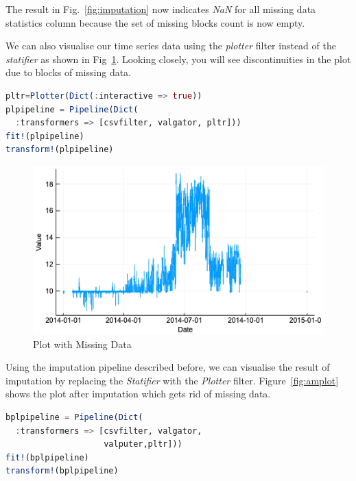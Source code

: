 \documentclass{juliacon}
\begin{document}
The result in Fig.~\ref{fig:imputation} now indicates \emph{NaN} for all missing data statistics column because the set 
of missing blocks count is now empty.

\vskip 3pt

We can also visualise our time series data using the \emph{plotter} filter instead of the \emph{statifier} as shown in Fig~\ref{fig:mplot}. Looking closely, you will see discontinuities in the plot due to blocks of missing data.

\begin{lstlisting}[language = Julia]
pltr=Plotter(Dict(:interactive => true))
plpipeline = Pipeline(Dict(
  :transformers => [csvfilter, valgator, pltr]))
fit!(plpipeline)
transform!(plpipeline)
\end{lstlisting}

\begin{figure}[htbp]
   \centering
   \includegraphics[width=\columnwidth]{mplot.png} %
   \caption{Plot with Missing Data}
   \label{fig:mplot}
\end{figure}

Using the imputation pipeline described before, we can visualise the result of imputation by replacing the \emph{Statifier} with the \emph{Plotter} filter. Figure~\ref{fig:amplot} shows the plot after imputation which gets rid of missing data.

\begin{lstlisting}[language = Julia]
bplpipeline = Pipeline(Dict(
  :transformers => [csvfilter, valgator, 
                    valputer,pltr]))
fit!(bplpipeline)
transform!(bplpipeline)
\end{lstlisting}
\end{document}
